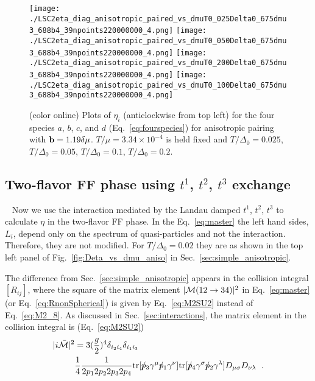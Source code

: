 \documentclass[10pt, aps, prd, superscriptaddress, nofootinbib, 
               amsmath, amssymb, twocolumn,
               preprintnumbers, showpacs,
               raggedbottom,
               floatfix]{revtex4-1}
\newcommand{\calM}{{\cal{M}}}
\newcommand{\slsh}[1]{#1\!\!\!/}
\newcommand{\tr}{{\rm{tr}}}
\newcommand{\bfb}{{\bf{b}}}
\begin{document}
\begin{figure*}[tbp]
\texttt{[image: ./LSC2eta\_diag\_anisotropic\_paired\_vs\_dmuT0\_025Delta0\_675dmu3\_688b4\_39npoints220000000\_4.png]}
\texttt{[image: ./LSC2eta\_diag\_anisotropic\_paired\_vs\_dmuT0\_050Delta0\_675dmu3\_688b4\_39npoints220000000\_4.png]}
\texttt{[image: ./LSC2eta\_diag\_anisotropic\_paired\_vs\_dmuT0\_200Delta0\_675dmu3\_688b4\_39npoints220000000\_4.png]}
\texttt{[image: ./LSC2eta\_diag\_anisotropic\_paired\_vs\_dmuT0\_100Delta0\_675dmu3\_688b4\_39npoints220000000\_4.png]}
  \caption{(color online) Plots of $\eta_i$
  (anticlockwise from top left) for the four species $a$, $b$,
  $c$, and $d$ (Eq.~\ref{eq:fourspecies}) for anisotropic pairing with
  $\bfb=1.19\delta\mu$. $T/\mu=3.34\times10^{-4}$ is held fixed and
  $T/\Delta_0=0.025$, $T/\Delta_0=0.05$, $T/\Delta_0=0.1$, $T/\Delta_0=0.2$.
  ~\label{fig:Leta_vs_dmu_aniso_vs_T} } \end{figure*}

\subsection{Two-flavor FF phase using $t^1$, $t^2$, $t^3$ exchange}
~\label{sec:t123}
Now we use the interaction mediated by the Landau damped $t^1$, $t^2$,
$t^3$ to calculate $\eta$ in the two-flavor FF phase. In the
Eq.~\ref{eq:master} the left hand sides, $L_i$, depend only on the spectrum of
quasi-particles and not the interaction. Therefore, they are not modified. For
$T/\Delta_0=0.02$ they are as shown in the top left panel of
Fig.~\ref{fig:Deta_vs_dmu_aniso} in Sec.~\ref{sec:simple_anisotropic}. 

The difference from Sec.~\ref{sec:simple_anisotropic} appears in the collision
integral $[R_{ij}]$, where the square of the matrix element
$|\calM(12\rightarrow34)|^2$ in Eq.~\ref{eq:master} (or
Eq.~\ref{eq:RnonSpherical}) is given by Eq.~\ref{eq:M2SU2} instead of
Eq.~\ref{eq:M2_8}. As discussed in Sec.~\ref{sec:interactions}, the matrix element in the collision
integral is (Eq.~\ref{eq:M2SU2})
\begin{equation}
\begin{split}
|i\bar{\cal{M}}|^2 &= 3(\frac{g}{2})^4\delta_{i_2i_4}\delta_{i_1i_3}\\
&
\frac{1}{4}\frac{1}{2p_12p_22p_32p_4}\tr[\slsh{p}_3\gamma^\mu\slsh{p}_1\gamma^\nu]
   \tr[\slsh{p}_4\gamma^\sigma\slsh{p}_2\gamma^\lambda]
   {D}_{\mu\sigma}{D}_{\nu\lambda}~\label{eq:M2SU2v2}\;.
\end{split}
\end{equation}
\end{document}
